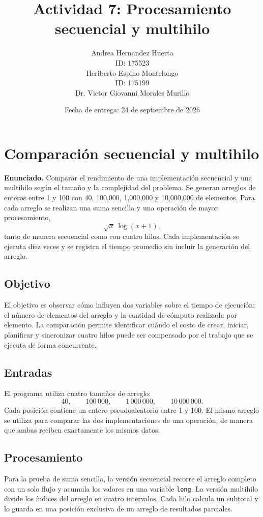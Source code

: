 \documentclass[12pt,oneside]{template/liverpoolthesis}
\title{Actividad 7: Procesamiento secuencial y multihilo}
\author{%
  Andrea Hernandez Huerta\\
  ID: 175523\\[1em]
  Heriberto Espino Montelongo\\
  ID: 175199\\[1em]
  \text{Profesor:} Dr. Victor Giovanni Morales Murillo}
\date{Fecha de entrega: 24 de septiembre de 2026}
\begin{document}
\frontmatter
\maketitle
\tableofcontents
\listoffigures
\listoftables

\mainmatter

\chapter{Comparación secuencial y multihilo}

\textbf{Enunciado.} Comparar el rendimiento de una implementación secuencial y
una multihilo según el tamaño y la complejidad del problema. Se generan
arreglos de enteros entre 1 y 100 con 40, 100,000, 1,000,000 y 10,000,000 de
elementos. Para cada arreglo se realizan una suma sencilla y una operación de
mayor procesamiento,
\[
  \sqrt{x}\,\log(x+1),
\]
tanto de manera secuencial como con cuatro hilos. Cada implementación se
ejecuta diez veces y se registra el tiempo promedio sin incluir la generación
del arreglo.

\section{Objetivo}

El objetivo es observar cómo influyen dos variables sobre el tiempo de
ejecución: el número de elementos del arreglo y la cantidad de cómputo
realizada por elemento. La comparación permite identificar cuándo el costo de
crear, iniciar, planificar y sincronizar cuatro hilos puede ser compensado por
el trabajo que se ejecuta de forma concurrente.

\section{Entradas}

El programa utiliza cuatro tamaños de arreglo:
\[
40,\qquad 100\,000,\qquad 1\,000\,000,\qquad 10\,000\,000.
\]
Cada posición contiene un entero pseudoaleatorio entre 1 y 100. El mismo
arreglo se utiliza para comparar las dos implementaciones de una operación, de
manera que ambas reciben exactamente los mismos datos.

\section{Procesamiento}

Para la prueba de suma sencilla, la versión secuencial recorre el arreglo
completo con un solo flujo y acumula los valores en una variable
\texttt{long}. La versión multihilo divide los índices del arreglo en cuatro
intervalos. Cada hilo calcula un subtotal y lo guarda en una posición exclusiva
de un arreglo de resultados parciales.
\end{document}
